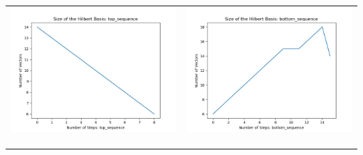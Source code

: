 \documentclass[10pt]{article}
\begin{document}
\begin{tabular}{c|c}
\begin{minipage}{.45\textwidth}
\includegraphics[width=\textwidth]{"DATA/4d/4 generators 2 bound D/top_sequence SIZE"}
\end{minipage} &
\begin{minipage}{.45\textwidth}
\includegraphics[width=\textwidth]{"DATA/4d/4 generators 2 bound D bottomup/bottom_sequence SIZE"}
\end{minipage} \\ \\
\hline \\\begin{minipage}{.45\textwidth}

\end{minipage}
\end{tabular}
\end{document}
